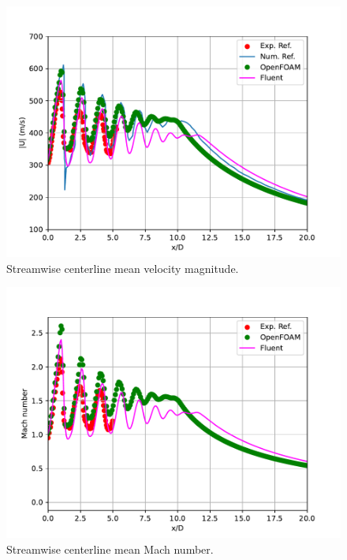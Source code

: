\documentclass[12pt]{article}
\begin{document}
\begin{figure}[H]
    \centering
    \includegraphics[width=0.925\linewidth]{figs/rhoCentralFoam/velocity_mag.pdf}
    \caption{Streamwise centerline mean velocity magnitude.}
    \label{fig:vel_mag}
\end{figure}

\begin{figure}[H]
    \centering
    \includegraphics[width=0.925\linewidth]{figs/rhoCentralFoam/M.pdf}
    \caption{Streamwise centerline mean Mach number.}
    \label{fig:mach}
\end{figure}
\end{document}
